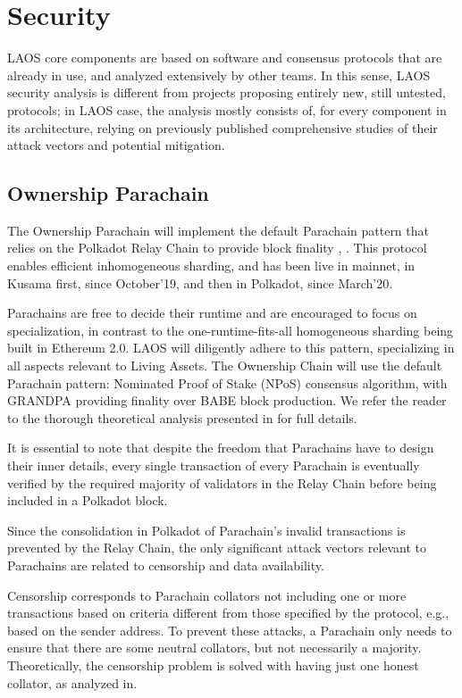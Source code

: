 \section{Security}\label{security}

LAOS core components are based on software and consensus protocols
that are already in use,
and analyzed extensively by other teams.
In this sense, LAOS security analysis is different from 
projects proposing entirely new, still untested, protocols;
in LAOS case, the analysis mostly consists of, for every component
in its architecture, relying on previously published
comprehensive studies of their attack vectors and potential mitigation.

\subsection{Ownership Parachain}\label{sec:security-parachain}

The Ownership Parachain will
implement the default Parachain pattern that relies on the Polkadot
Relay Chain to provide block finality \cite{parachain-protocol}, \cite{parachain-protocol2}.
This protocol enables efficient inhomogeneous sharding,
and has been live in mainnet, in Kusama first, since
October'19, and then in Polkadot, since March'20.

Parachains are free to decide their runtime and are encouraged to focus on 
specialization, in contrast to the one-runtime-fits-all
homogeneous sharding being built in Ethereum 2.0.
LAOS will diligently adhere to this pattern,
specializing in all aspects relevant to Living Assets.
The Ownership Chain will use the default Parachain pattern:
Nominated Proof of Stake (NPoS) consensus algorithm,
with GRANDPA providing finality over BABE block production.
We refer the reader to the thorough theoretical analysis presented in\cite{polkadotExplained}
for full details.

It is essential to note that despite the freedom that Parachains have to design
their inner details, every single transaction of every Parachain is eventually
verified by the required majority of validators in the Relay Chain before
being included in a Polkadot block. 

Since the consolidation in Polkadot of Parachain's 
invalid transactions is prevented by the Relay Chain, 
the only significant attack vectors relevant to Parachains
are related to censorship and data availability.

Censorship corresponds to Parachain collators not including one or more
transactions based on criteria different from those specified by the
protocol, e.g., based on the sender address. To prevent these attacks,
a Parachain only needs to ensure that there are some neutral collators,
but not necessarily a majority.
Theoretically, the censorship problem is solved with 
having just one honest collator,
as analyzed in\cite{collators}.

